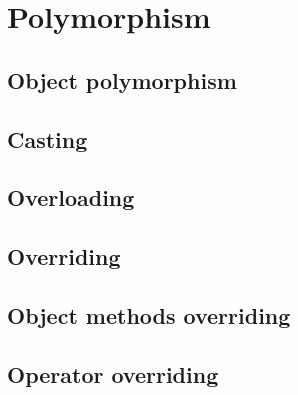 \documentclass{KodeBook}
\begin{document}
	\chapter{Polymorphism}
\fi


\section{Object polymorphism}


\section{Casting}


\section{Overloading}


\section{Overriding}


\section{Object methods overriding}


\section{Operator overriding}



\ifx\wholebook\relax\else
% 
% 
	
\end{document}
